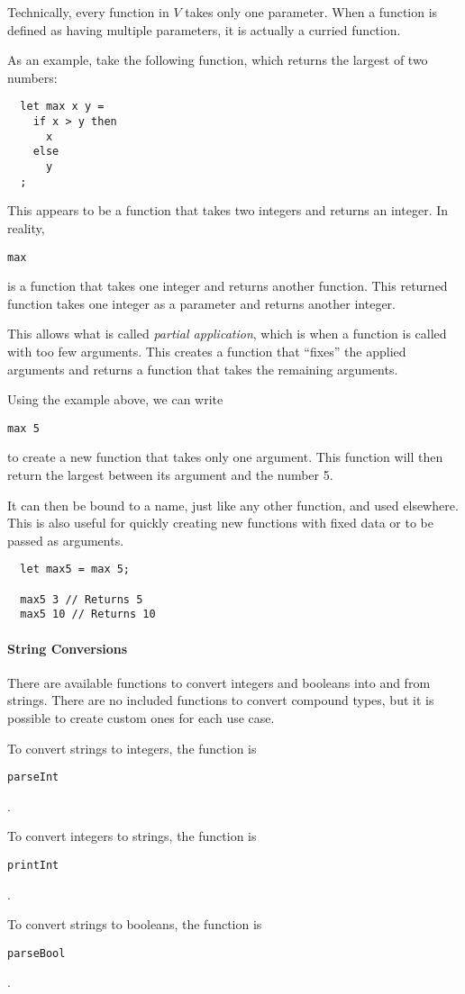 \documentclass{article}
\def\code#1{\begin{footnotesize}\texttt{#1}\end{footnotesize}}
\begin{document}
Technically, every function in $V$ takes only one parameter.
When a function is defined as having multiple parameters, it is actually a curried function.

As an example, take the following function, which returns the largest of two numbers:

\begin{lstlisting}
  let max x y =
    if x > y then
      x
    else
      y
  ;
\end{lstlisting}

This appears to be a function that takes two integers and returns an integer.
In reality, \code{max} is a function that takes one integer and returns another function.
This returned function takes one integer as a parameter and returns another integer.

This allows what is called \emph{partial application}, which is when a function is called with too few arguments.
This creates a function that ``fixes'' the applied arguments and returns a function that takes the remaining arguments.

Using the example above, we can write \code{max 5} to create a new function that takes only one argument.
This function will then return the largest between its argument and the number 5.

It can then be bound to a name, just like any other function, and used elsewhere.
This is also useful for quickly creating new functions with fixed data or to be passed as arguments.

\begin{lstlisting}
  let max5 = max 5;

  max5 3 // Returns 5
  max5 10 // Returns 10
\end{lstlisting}

\paragraph{String Conversions}

There are available functions to convert integers and booleans into and from strings.
There are no included functions to convert compound types, but it is possible to create custom ones for each use case.

To convert strings to integers, the function is \code{parseInt}.

To convert integers to strings, the function is \code{printInt}.

To convert strings to booleans, the function is \code{parseBool}.
\end{document}
